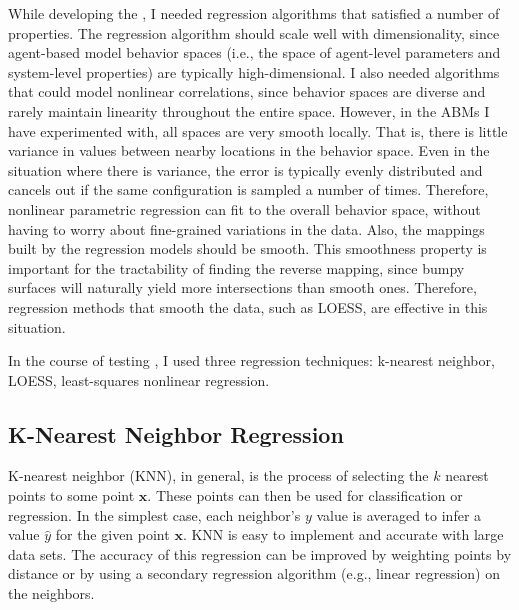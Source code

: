 While developing the \framework, I needed regression algorithms that satisfied a number of properties.
The regression algorithm should scale well with dimensionality, since agent-based model behavior spaces (i.e., the space of agent-level parameters and system-level properties) are typically high-dimensional.
I also needed algorithms that could model nonlinear correlations, since behavior spaces are diverse and rarely maintain linearity throughout the entire space.
However, in the ABMs I have experimented with, all spaces are very smooth locally.
That is, there is little variance in values between nearby locations in the behavior space.
Even in the situation where there is variance, the error is typically evenly distributed and cancels out if the same configuration is sampled a number of times.
Therefore, nonlinear parametric regression can fit to the overall behavior space, without having to worry about fine-grained variations in the data.
Also, the mappings built by the regression models should be smooth.
This smoothness property is important for the tractability of finding the reverse mapping, since bumpy surfaces will naturally yield more intersections than smooth ones.
Therefore, regression methods that smooth the data, such as LOESS, are effective in this situation.

In the course of testing \fw, I used three regression techniques: k-nearest neighbor, LOESS, least-squares nonlinear regression.

\subsection{K-Nearest Neighbor Regression}
K-nearest neighbor (KNN), in general, is the process of selecting the $k$ nearest points to some point $\mathbf x$.
These points can then be used for classification or regression.
In the simplest case, each neighbor's $y$ value is averaged to infer a value $\hat y$ for the given point $\mathbf x$.
KNN is easy to implement and accurate with large data sets.
The accuracy of this regression can be improved by weighting points by distance or by using a secondary regression algorithm (e.g., linear regression) on the neighbors.

